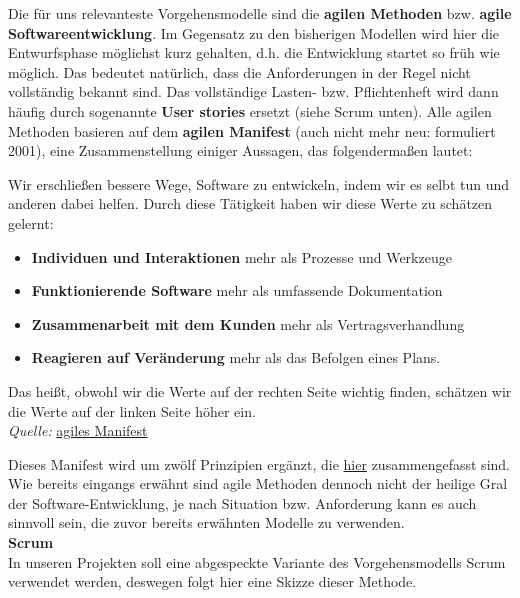 \documentclass{article}
\begin{document}
Die für uns relevanteste Vorgehensmodelle sind die \textbf{agilen Methoden} bzw. \textbf{agile Softwareentwicklung}. Im Gegensatz zu den bisherigen Modellen wird hier die Entwurfsphase möglichst kurz gehalten, d.h. die Entwicklung startet so früh wie möglich. Das bedeutet natürlich, dass die Anforderungen in der Regel nicht vollständig bekannt sind. Das vollständige Lasten- bzw. Pflichtenheft wird dann häufig durch sogenannte \textbf{User stories} ersetzt (siehe Scrum unten). Alle agilen Methoden basieren auf dem \textbf{agilen Manifest} (auch nicht mehr neu: formuliert 2001), eine Zusammenstellung einiger Aussagen, das folgendermaßen lautet: 
\begin{center}
    Wir erschließen bessere Wege, Software zu entwickeln, indem wir es selbt tun und anderen dabei helfen. Durch diese Tätigkeit haben wir diese Werte zu schätzen gelernt:
    \begin{itemize}
        \item \textbf{Individuen und Interaktionen} mehr als Prozesse und Werkzeuge
        \item \textbf{Funktionierende Software} mehr als umfassende Dokumentation
        \item \textbf{Zusammenarbeit mit dem Kunden} mehr als Vertragsverhandlung
        \item \textbf{Reagieren auf Veränderung} mehr als das Befolgen eines Plans.
    \end{itemize}
    Das heißt, obwohl wir die Werte auf der rechten Seite wichtig finden, schätzen wir die Werte auf der linken Seite höher ein. \\
    \textit{Quelle:} \href{https://agilemanifesto.org/iso/de/manifesto.html}{agiles Manifest}
\end{center}
Dieses Manifest wird um zwölf Prinzipien ergänzt, die \href{https://agilemanifesto.org/iso/de/principles.html}{hier} zusammengefasst sind. \\
Wie bereits eingangs erwähnt sind agile Methoden dennoch nicht der heilige Gral der Software-Entwicklung, je nach Situation bzw. Anforderung kann es auch sinnvoll sein, die zuvor bereits erwähnten Modelle zu verwenden. \vspace{3mm}\\

\textbf{Scrum} \\
In unseren Projekten soll eine abgespeckte Variante des Vorgehensmodells Scrum verwendet werden, deswegen folgt hier eine Skizze dieser Methode. \\
\end{document}

